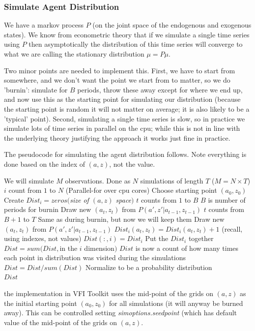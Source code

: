 \subsubsection{Simulate Agent Distribution}
We have a markov process $P$ (on the joint space of the endogenous and exogenous states). We know from econometric theory that if we simulate a single time series using $P$ then asymptotically the distribution of this time series will converge to what we are calling the stationary distribution $\mu = P \mu$.

Two minor points are needed to implement this. First, we have to start from somewhere, and we don't want the point we start from to matter, so we do 'burnin': simulate for $B$ periods, throw these away except for where we end up, and now use this as the starting point for simulating our distribution (because the starting point is random it will not matter on average; it is also likely to be a 'typical' point). Second, simulating a single time series is slow, so in practice we simulate lots of time series in parallel on the cpu; while this is not in line with the underlying theory justifying the approach it works just fine in practice.

The pseudocode for simulating the agent distribution follows. Note everything is done based on the index of $(a,z)$, not the value.
\begin{algorithmic}
 \State We will simulate $M$ observations. Done as $N$ simulations of length $T$ ($M=N \times T$)
 \For $i$ count from $1$ to $N$ (Parallel-for over cpu cores)
  \State Choose starting point $(a_0,z_0)$
  \State Create $Dist_i=zeros($\textit{size of $(a,z)$ space}$)$
  \For $t$ counts from $1$ to $B$ \Comment $B$ is number of periods for burnin
   \State Draw new $(a_t,z_t)$ from $P(a',z'|a_{t-1},z_{t-1})$
   \EndFor
  \For $t$ counts from $B+1$ to $T$ \Comment Same as during burnin, but now we will keep them
   \State Draw new $(a_t,z_t)$ from $P(a',z'|a_{t-1},z_{t-1})$
   \State $Dist_i(a_t, z_t)=Dist_i(a_t, z_t)+1$ (recall, using indexes, not values)
  \EndFor
  \State $Dist(:,i)=Dist_i$ \Comment Put the $Dist_i$ together
 \EndFor
 \State $Dist=sum(Dist,$in the $i$ dimension$)$
 \Comment $Dist$ is now a count of how many times each point in distribution was visited during the simulations
 \State $Dist=Dist/sum(Dist)$
 \Comment Normalize to be a probability distribution
 \\ \Return $Dist$
\end{algorithmic}
the implementation in VFI Toolkit uses the mid-point of the grids on $(a,z)$ as the initial starting point $(a_0,z_0)$ for all simulations (it will anyway be burned away). This can be controlled setting \textit{simoptions.seedpoint} (which has default value of the mid-point of the grids on $(a,z)$.


